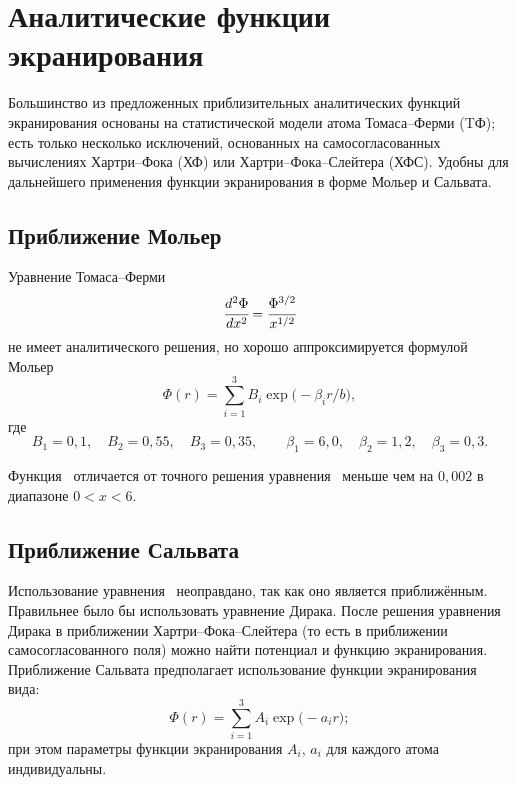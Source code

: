   \section{Аналитические функции экранирования}

  Большинство из предложенных приблизительных аналитических
  функций экранирования основаны на статистической модели
  атома Томаса--Ферми (TФ); есть только несколько исключений,
  основанных на самосогласованных вычислениях Хартри--Фока (ХФ)
  или Хартри--Фока--Слейтера (ХФС). Удобны для дальнейшего
  применения функции экранирования в форме Мольер и Сальвата.

  \subsection{Приближение Мольер}

  Уравнение Томаса--Ферми
  \begin{equation}
    \cfrac{d^2\Phi}{dx^2} = \cfrac{\Phi^{3/2}}{x^{1/2}}
    \label{eq:Thomas}
  \end{equation}
  не имеет аналитического  решения, но хорошо аппроксимируется
  формулой Мольер
  \begin{equation}
    \Phi(r)=\sum_{i=1}^3B_i\exp\bigl(-\beta_ir/b\big),
    \label{eq:Moliere}
  \end{equation}
  где
  \[
    B_1 = 0,\!1, \quad B_2 = 0,\!55, \quad B_3 = 0,\!35, \qquad
      \beta_1 = 6,\!0, \quad \beta_2 = 1,\!2, \quad \beta_3 = 0,\!3.
  \]

  Функция~ отличается от точного решения
  уравнения~ меньше чем на \( 0{,}002 \) в диапазоне
  \( 0 < x < 6 \).

  \subsection{Приближение Сальвата}

  Использование уравнения~ неоправдано, так как оно является
  приближённым. Правильнее было бы использовать уравнение Дирака.
  После решения уравнения Дирака в приближении Хартри--Фока--Слейтера
  (то есть в приближении самосогласованного поля) можно найти
  потенциал и функцию экранирования. Приближение Сальвата
  предполагает использование функции экранирования вида:
  \begin{equation}
    \Phi(r) = \sum_{i = 1}^3 A_i\exp\bigl(-a_ir\big);
    \label{eq:Salvat}
  \end{equation}
  при этом параметры функции экранирования \( A_i \), \( a_i \) для каждого
  атома индивидуальны.

